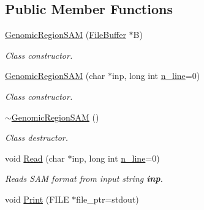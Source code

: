 \subsection*{Public Member Functions}
\begin{CompactItemize}
\item 
\hypertarget{classGenomicRegionSAM_e6b0828926a573743e7292567346c1a1}{
\hyperlink{classGenomicRegionSAM_e6b0828926a573743e7292567346c1a1}{GenomicRegionSAM} (\hyperlink{classFileBuffer}{FileBuffer} $\ast$B)}
\label{classGenomicRegionSAM_e6b0828926a573743e7292567346c1a1}

\begin{CompactList}\small\item\em Class constructor. \item\end{CompactList}\item 
\hypertarget{classGenomicRegionSAM_25247d97947a54583fb17d493df4a0cf}{
\hyperlink{classGenomicRegionSAM_25247d97947a54583fb17d493df4a0cf}{GenomicRegionSAM} (char $\ast$inp, long int \hyperlink{classGenomicRegion_efe2255aeed5338060190ded05cb9c0c}{n\_\-line}=0)}
\label{classGenomicRegionSAM_25247d97947a54583fb17d493df4a0cf}

\begin{CompactList}\small\item\em Class constructor. \item\end{CompactList}\item 
\hypertarget{classGenomicRegionSAM_1d11cc22134d13dbf67ffe4c7220888d}{
\hyperlink{classGenomicRegionSAM_1d11cc22134d13dbf67ffe4c7220888d}{$\sim$GenomicRegionSAM} ()}
\label{classGenomicRegionSAM_1d11cc22134d13dbf67ffe4c7220888d}

\begin{CompactList}\small\item\em Class destructor. \item\end{CompactList}\item 
\hypertarget{classGenomicRegionSAM_096d90b6743400daf1acb50bcf17086a}{
void \hyperlink{classGenomicRegionSAM_096d90b6743400daf1acb50bcf17086a}{Read} (char $\ast$inp, long int \hyperlink{classGenomicRegion_efe2255aeed5338060190ded05cb9c0c}{n\_\-line}=0)}
\label{classGenomicRegionSAM_096d90b6743400daf1acb50bcf17086a}

\begin{CompactList}\small\item\em Reads SAM format from input string {\bf inp}. \item\end{CompactList}\item 
\hypertarget{classGenomicRegionSAM_4381c6486f767b6e4055cb729beee181}{
void \hyperlink{classGenomicRegionSAM_4381c6486f767b6e4055cb729beee181}{Print} (FILE $\ast$file\_\-ptr=stdout)}
\label{classGenomicRegionSAM_4381c6486f767b6e4055cb729beee181}


\end{CompactItemize}

